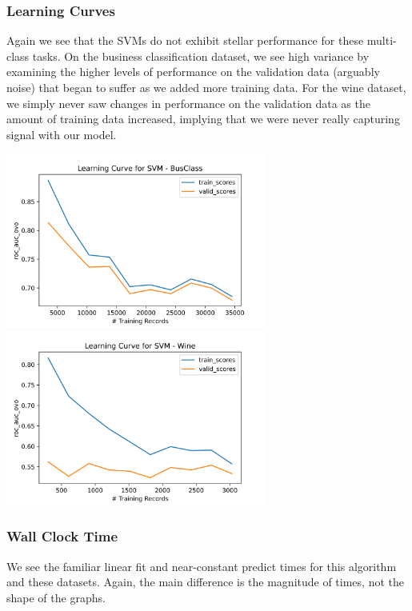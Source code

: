 \documentclass[
	letterpaper, %
]{jdf}
\begin{document}
\subsubsection{Learning Curves}

Again we see that the SVMs do not exhibit stellar performance for these multi-class tasks. On the business classification dataset, we see high variance by examining the higher levels of performance on the validation data (arguably noise) that began to suffer as we added more training data. For the wine dataset, we simply never saw changes in performance on the validation data as the amount of training data increased, implying that we were never really capturing signal with our model.

\includegraphics[width=3.4in]{Figures/BusClass-0920/SVM/learn_curve.png}
\includegraphics[width=3.4in]{Figures/Wine-0921/SVM/learn_curve.png}

\subsubsection{Wall Clock Time}
We see the familiar linear fit and near-constant predict times for this algorithm and these datasets. Again, the main difference is the magnitude of times, not the shape of the graphs.
\end{document}

